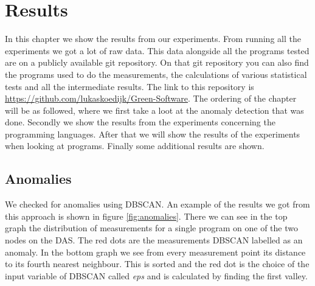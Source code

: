 \chapter{Results}
\label{ch:results}
In this chapter we show the results from our experiments. From running all the experiments we got a lot of raw data. This data alongside all the programs tested are on a publicly available git repository. On that git repository you can also find the programs used to do the measurements, the calculations of various statistical tests and all the intermediate results. The link to this repository is \url{https://github.com/lukaskoedijk/Green-Software}. The ordering of the chapter will be as followed, where we first take a loot at the anomaly detection that was done. Secondly we show the results from the experiments concerning the programming languages. After that we will show the results of the experiments when looking at programs. Finally some additional results are shown.






\section{Anomalies}
We checked for anomalies using DBSCAN. An example of the results we got from this approach is shown in figure \ref{fig:anomalies}. There we can see in the top graph the distribution of measurements for a single program on one of the two nodes on the DAS. The red dots are the measurements DBSCAN labelled as an anomaly. In the bottom graph we see from every measurement point its distance to its fourth nearest neighbour. This is sorted and the red dot is the choice of the input variable of DBSCAN called \textit{eps} and is calculated by finding the first valley.\\

